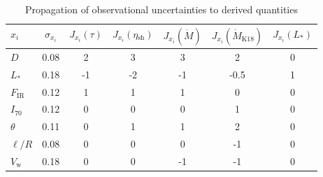 \documentclass[useAMS, usenatbib, a4paper]{mnras}
\newcommand{\wind}{\ensuremath{_{\text{w}}}}
\newcommand\IR{\ensuremath{_{\text{IR}}}}
\newcommand\shell{\ensuremath{_{\text{sh}}}}
\begin{document}
\begin{table}
  \centering
  \caption[Derived]{Propagation of observational uncertainties to derived quantities}
  \label{tab:derived-parameters}
  \setlength\tabcolsep{3pt}
  \begin{tabular}{l S S S S S S}
    \toprule
    \(x_i\) & {\(\sigma_{x_i}\)}
    & {\(J_{x_i} (\tau)\)} & {\(J_{x_i} (\eta\shell)\)}
    & {\(J_{x_i} (\dot M)\)} & {\(J_{x_i} (\dot M_{\text{K18}})\)}
    & {\(J_{x_i} (L_*)\)}
    \\
    \midrule
    \(D\)     & 0.08 & 2  & 3 & 3 & 2 & 0\\
    \(L_*\)   & 0.18 & -1 & -2 & -1 & -0.5 & 1\\
    \(F\IR\)  & 0.12 & 1 & 1 & 1 & 0 & 0\\
    \(I_{70}\) & 0.12 & 0 & 0 & 0 & 1 & 0\\
    \(\theta\) & 0.11 & 0 & 1 & 1 & 2 & 0\\
    \(\ell/R\) & 0.08 & 0 & 0 & 0 & -1 & 0\\
    \(V\wind\) & 0.18 & 0 & 0 & -1 & -1 & 0\\
    \bottomrule
  \end{tabular}
\end{table}
\end{document}
